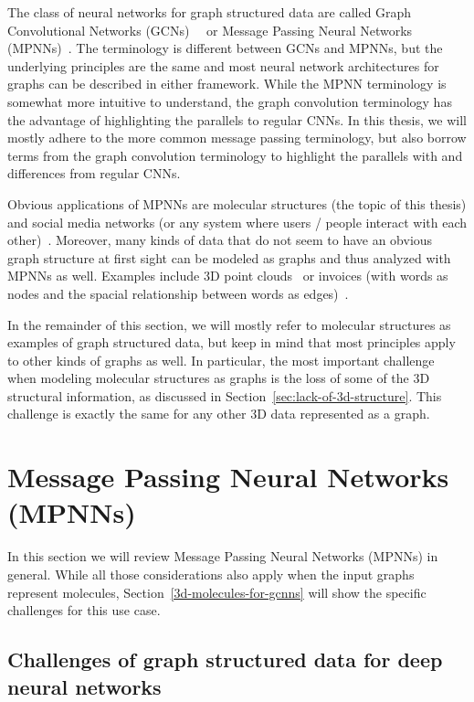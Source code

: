 The class of neural networks for graph structured data are called Graph Convolutional Networks (GCNs)~\cite{Kipf2017}~\cite{Schutt2017} or Message Passing Neural Networks (MPNNs)~\cite{Gilmer2017}. The terminology is different between GCNs and MPNNs, but the underlying principles are the same and most neural network architectures for graphs can be described in either framework. While the MPNN terminology is somewhat more intuitive to understand, the graph convolution terminology has the advantage of highlighting the parallels to regular CNNs. In this thesis, we will mostly adhere to the more common message passing terminology, but also borrow terms from the graph convolution terminology to highlight the parallels with and differences from regular CNNs.

Obvious applications of MPNNs are molecular structures (the topic of this thesis) and social media networks (or any system where users / people interact with each other)~\cite{Zhou2018}. Moreover, many kinds of data that do not seem to have an obvious graph structure at first sight can be modeled as graphs and thus analyzed with MPNNs as well. Examples include 3D point clouds~\cite{Charles2017} or invoices (with words as nodes and the spacial relationship between words as edges)~\cite{Riba2019}.

In the remainder of this section, we will mostly refer to molecular structures as examples of graph structured data, but keep in mind that most principles apply to other kinds of graphs as well. In particular, the most important challenge when modeling molecular structures as graphs is the loss of some of the 3D structural information, as discussed in Section~\ref{sec:lack-of-3d-structure}. This challenge is exactly the same for any other 3D data represented as a graph.

\section{Message Passing Neural Networks (MPNNs)}

In this section we will review Message Passing Neural Networks (MPNNs) in general. While all those considerations also apply when the input graphs represent molecules, Section~\ref{3d-molecules-for-gcnns} will show the specific challenges for this use case.

\subsection{Challenges of graph structured data for deep neural networks}
\label{sec:graph-challenges}

